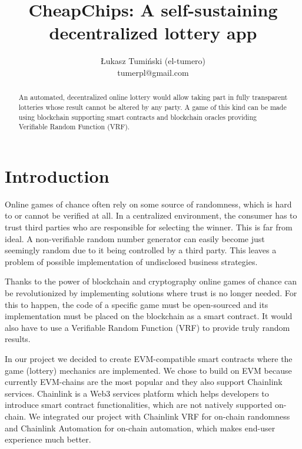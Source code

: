 \documentclass[12pt]{article}
\begin{document}
\title{\textbf{\Huge CheapChips: A self-sustaining decentralized lottery app }}

\author{\normalsize Łukasz Tumiński (el-tumero) \\ \small tumerpl@gmail.com}
\date{}
\maketitle



\begin{abstract}
An automated, decentralized online lottery would allow taking part in fully transparent lotteries whose result cannot be altered by any party. A game of this kind can be made using blockchain supporting smart contracts and blockchain oracles providing Verifiable Random Function (VRF).
\end{abstract}


\section{Introduction}
Online games of chance often rely on some source of randomness, which is hard to or cannot be verified at all. In a centralized environment, the consumer has to trust third parties who are responsible for selecting the winner. This is far from ideal. A non-verifiable random number generator can easily become just seemingly random due to it being controlled by a third party. This leaves a problem of possible implementation of undisclosed business strategies.

Thanks to the power of blockchain and cryptography online games of chance can be revolutionized by implementing solutions where trust is no longer needed. For this to happen, the code of a specific game must be open-sourced and its implementation must be placed on the blockchain as a smart contract\cite{smartcontract}. It would also have to use a Verifiable Random Function (VRF) to provide truly random results.

In our project we decided to create EVM-compatible smart contracts where the game (lottery) mechanics are implemented. We chose to build on EVM\cite{evm} because currently EVM-chains are the most popular and they also support Chainlink services.
Chainlink\cite{chainlink} is a Web3 services platform which helps developers to introduce smart contract functionalities, which are not natively supported on-chain. We integrated our project with Chainlink VRF\cite{vrf} for on-chain randomness and Chainlink Automation\cite{automation} for on-chain automation, which makes end-user experience much better.
\end{document}
